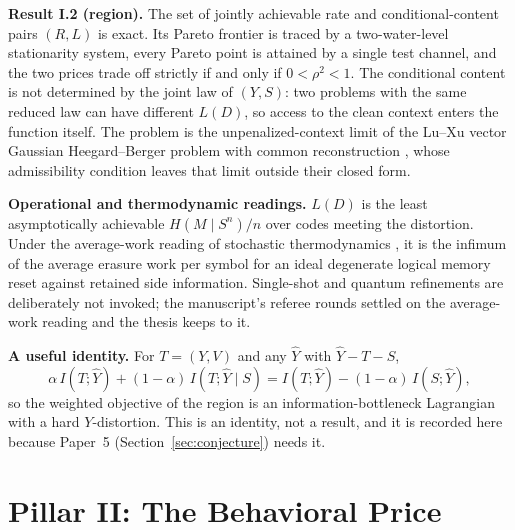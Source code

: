 \documentclass[11pt,onecolumn]{IEEEtran}
\newcommand{\hY}{\hat Y}
\begin{document}
\textbf{Result I.2 (region).}
The set of jointly achievable rate and conditional-content pairs $(R,L)$ is exact.
Its Pareto frontier is traced by a two-water-level stationarity system, every Pareto point is attained by a single test channel, and the two prices trade off strictly if and only if $0<\rho^2<1$.
The conditional content is not determined by the joint law of $(Y,S)$: two problems with the same reduced law can have different $L(D)$, so access to the clean context enters the function itself.
The problem is the unpenalized-context limit of the Lu--Xu vector Gaussian Heegard--Berger problem with common reconstruction \cite{luxu2021}, whose admissibility condition leaves that limit outside their closed form.

\textbf{Operational and thermodynamic readings.}
$L(D)$ is the least asymptotically achievable $H(M\mid S^n)/n$ over codes meeting the distortion.
Under the average-work reading of stochastic thermodynamics \cite{landauer1961,esposito2011,sagawa2012,parrondo2015}, it is the infimum of the average erasure work per symbol for an ideal degenerate logical memory reset against retained side information.
Single-shot and quantum refinements \cite{sagawa2009} are deliberately not invoked; the manuscript's referee rounds settled on the average-work reading and the thesis keeps to it.

\textbf{A useful identity.}
For $T=(Y,V)$ and any $\hY$ with $\hY - T - S$,
\begin{equation}
\alpha\,I(T;\hY)+(1-\alpha)\,I(T;\hY\mid S)=I(T;\hY)-(1-\alpha)\,I(S;\hY),
\end{equation}
so the weighted objective of the region is an information-bottleneck Lagrangian with a hard $Y$-distortion.
This is an identity, not a result, and it is recorded here because Paper~5 (Section~\ref{sec:conjecture}) needs it.

\section{Pillar II: The Behavioral Price}
\end{document}
